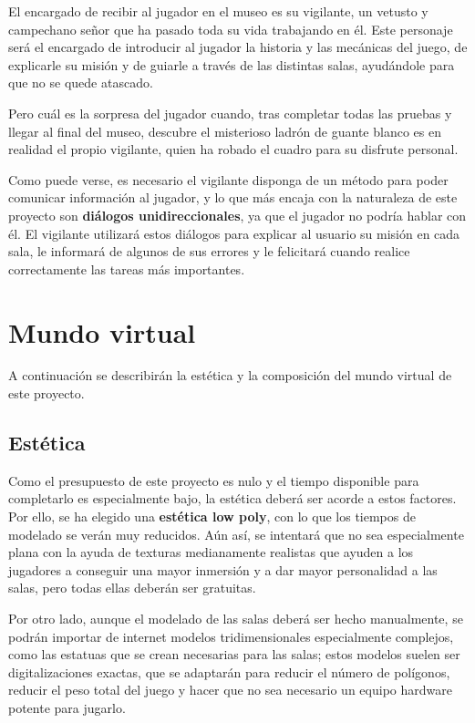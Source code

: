 El encargado de recibir al jugador en el museo es su vigilante, un vetusto y campechano señor que ha pasado toda su vida trabajando en él. Este personaje será el encargado de introducir al jugador la historia y las mecánicas del juego, de explicarle su misión y de guiarle a través de las distintas salas, ayudándole para que no se quede atascado.

Pero cuál es la sorpresa del jugador cuando, tras completar todas las pruebas y llegar al final del museo, descubre el misterioso ladrón de guante blanco es en realidad el propio vigilante, quien ha robado el cuadro para su disfrute personal.

Como puede verse, es necesario el vigilante disponga de un método para poder comunicar información al jugador, y lo que más encaja con la naturaleza de este proyecto son \textbf{diálogos unidireccionales}, ya que el jugador no podría hablar con él. El vigilante utilizará estos diálogos para explicar al usuario su misión en cada sala, le informará de algunos de sus errores y le felicitará cuando realice correctamente las tareas más importantes.

\section{Mundo virtual}

A continuación se describirán la estética y la composición del mundo virtual de este proyecto.

\subsection{Estética}

Como el presupuesto de este proyecto es nulo y el tiempo disponible para completarlo es especialmente bajo, la estética deberá ser acorde a estos factores. Por ello, se ha elegido una \textbf{estética low poly}, con lo que los tiempos de modelado se verán muy reducidos. Aún así, se intentará que no sea especialmente plana con la ayuda de texturas medianamente realistas que ayuden a los jugadores a conseguir una mayor inmersión y a dar mayor personalidad a las salas, pero todas ellas deberán ser gratuitas.

Por otro lado, aunque el modelado de las salas deberá ser hecho manualmente, se podrán importar de internet modelos tridimensionales especialmente complejos, como las estatuas que se crean necesarias para las salas; estos modelos suelen ser digitalizaciones exactas, que se adaptarán para reducir el número de polígonos, reducir el peso total del juego y hacer que no sea necesario un equipo hardware potente para jugarlo.

